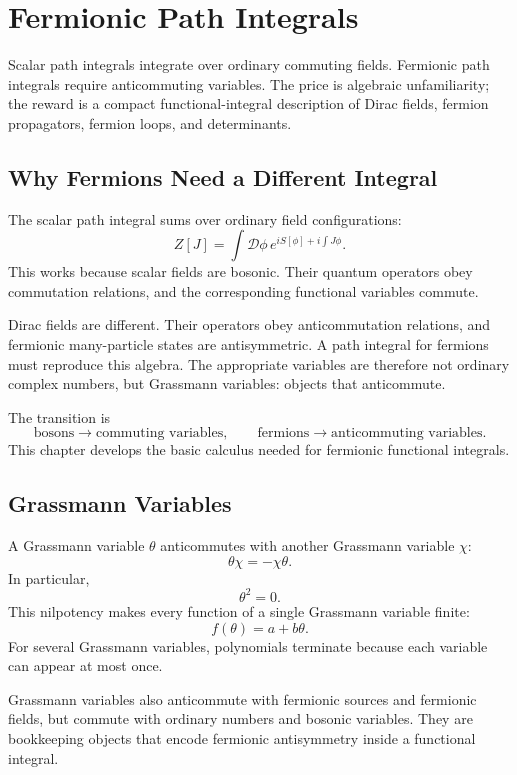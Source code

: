 \chapter{Fermionic Path Integrals}

\begin{remarkbox}
Scalar path integrals integrate over ordinary commuting fields. Fermionic path
integrals require anticommuting variables. The price is algebraic unfamiliarity;
the reward is a compact functional-integral description of Dirac fields,
fermion propagators, fermion loops, and determinants.
\end{remarkbox}

\section{Why Fermions Need a Different Integral}

The scalar path integral sums over ordinary field configurations:
\[
    Z[J]=\int\mathcal{D}\phi\,e^{iS[\phi]+i\int J\phi}.
\]
This works because scalar fields are bosonic. Their quantum operators obey
commutation relations, and the corresponding functional variables commute.

Dirac fields are different. Their operators obey anticommutation relations, and
fermionic many-particle states are antisymmetric. A path integral for fermions
must reproduce this algebra. The appropriate variables are therefore not
ordinary complex numbers, but Grassmann variables: objects that anticommute.

The transition is
\[
    \text{bosons} \longrightarrow \text{commuting variables},
    \qquad
    \text{fermions} \longrightarrow \text{anticommuting variables}.
\]
This chapter develops the basic calculus needed for fermionic functional
integrals.

\section{Grassmann Variables}

A Grassmann variable \(\theta\) anticommutes with another Grassmann variable
\(\chi\):
\[
    \theta\chi=-\chi\theta.
\]
In particular,
\[
    \theta^2=0.
\]
This nilpotency makes every function of a single Grassmann variable finite:
\[
    f(\theta)=a+b\theta.
\]
For several Grassmann variables, polynomials terminate because each variable can
appear at most once.

Grassmann variables also anticommute with fermionic sources and fermionic fields,
but commute with ordinary numbers and bosonic variables. They are bookkeeping
objects that encode fermionic antisymmetry inside a functional integral.

